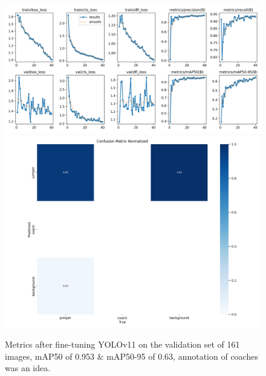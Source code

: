 \begin{figure}
    \centering
    \includegraphics[width=0.95\linewidth]{img/results}
    \includegraphics[width=0.85\linewidth]{img/confusion_matrix_normalized}
    \caption[metrics after fine-tuning YOLOv11]{Metrics after fine-tuning YOLOv11 on the validation set of 161 images, mAP50 of 0.953 \& mAP50-95 of 0.63, annotation of coaches was an idea.}
    \label{fig:localization-results}
\end{figure}

